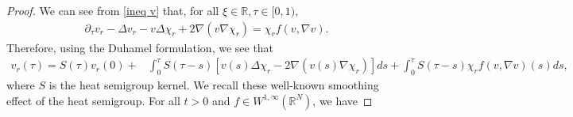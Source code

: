 \documentclass[11pt,a4paper]{article}
\newcommand{\1}{\mathbbm{1}}
\numberwithin{equation}{section}
\newcommand{\numberset}{\mathbb}
\newcommand{\R}{\numberset{R}}
\theoremstyle{remark}
\begin{document}
\begin{proof}
We can see from \eqref{ineq v} that, for all $\xi \in \R, \tau \in [0,1)$,
\begin{equation*}
\begin{split}
\partial_\tau v_r -\Delta v_r-v\Delta \chi_r+2\nabla(v\nabla \chi_r)=\chi_r f(v,\nabla v).
\end{split}
\end{equation*}
Therefore, using the Duhamel formulation, we see that 
\begin{equation*}
\begin{split}
v_r(\tau)= S(\tau) v_r(0)+&\int^\tau_0 S(\tau-s)\left[v(s)\Delta \chi_r-2\nabla(v(s)\nabla \chi_r)\right]ds+\int^\tau_0 S(\tau-s)\chi_r f(v,\nabla v)(s) ds,
\end{split}
\end{equation*}
where $S$ is the heat semigroup kernel. We recall these well-known smoothing effect of the heat semigroup. For all $t>0$ and  $f\in W^{1,\infty}(\R^N)$, we have


\end{proof}
\end{document}
